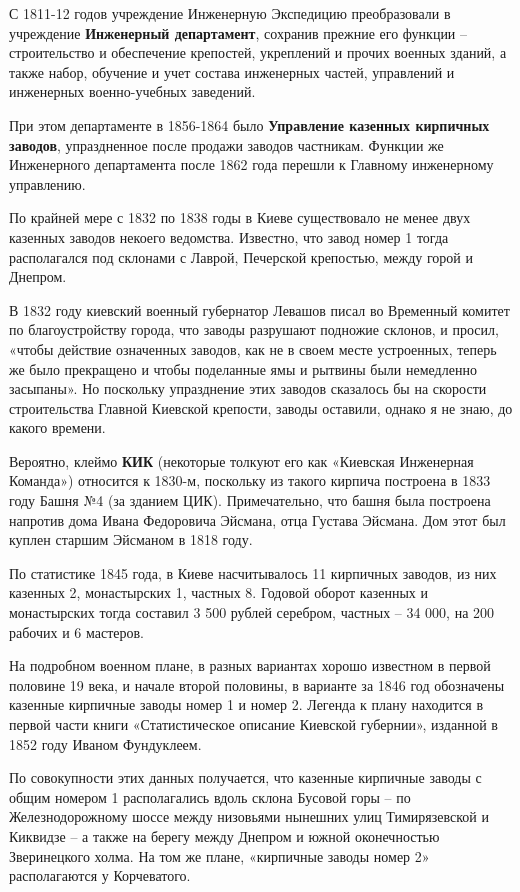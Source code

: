 С 1811-12 годов учреждение Инженерную Экспедицию преобразовали в учреждение \textbf{Инженерный департамент}, сохранив прежние его функции – строительство и обеспечение крепостей, укреплений и прочих военных зданий, а также набор, обучение и учет состава инженерных частей, управлений и инженерных военно-учебных заведений.

При этом департаменте в 1856-1864 было \textbf{Управление казенных кирпичных заводов}, упраздненное после продажи заводов частникам. Функции же Инженерного департамента после 1862 года перешли к Главному инженерному управлению.

По крайней мере с 1832 по 1838 годы в Киеве существовало не менее двух казенных заводов некоего ведомства. Известно, что завод номер 1 тогда располагался под склонами с Лаврой, Печерской крепостью, между горой и Днепром. 

В 1832 году киевский военный губернатор Левашов писал во Временный комитет по благоустройству города, что заводы разрушают подножие склонов, и просил, «чтобы действие означенных заводов, как не в своем месте устроенных, теперь же было прекращено и чтобы поделанные ямы и рытвины были немедленно засыпаны». Но поскольку упразднение этих заводов сказалось бы на скорости строительства Главной Киевской крепости, заводы оставили, однако я не знаю, до какого времени.

Вероятно, клеймо \textbf{КИК} (некоторые толкуют его как «Киевская Инженерная Команда») относится к 1830-м, поскольку из такого кирпича построена в 1833 году Башня №4 (за зданием ЦИК).  Примечательно, что башня была построена напротив дома Ивана Федоровича Эйсмана, отца Густава Эйсмана. Дом этот был куплен старшим Эйсманом в 1818 году.

По статистике 1845 года, в Киеве насчитывалось 11 кирпичных заводов, из них казенных 2, монастырских 1, частных 8. Годовой оборот казенных и монастырских тогда составил 3 500 рублей серебром, частных – 34 000, на 200 рабочих и 6 мастеров.

На подробном военном плане, в разных вариантах хорошо известном в первой половине 19 века, и начале второй половины, в варианте за 1846 год обозначены казенные кирпичные заводы номер 1 и номер 2. Легенда к плану находится в первой части книги «Статистическое описание Киевской губернии», изданной в 1852 году Иваном Фундуклеем. 

По совокупности этих данных получается, что казенные кирпичные заводы с общим номером 1 располагались вдоль склона Бусовой горы – по Железнодорожному шоссе между низовьями нынешних улиц Тимирязевской и Киквидзе – а также на берегу между Днепром и южной оконечностью Зверинецкого холма. На том же плане, «кирпичные заводы номер 2» располагаются у Корчеватого.


